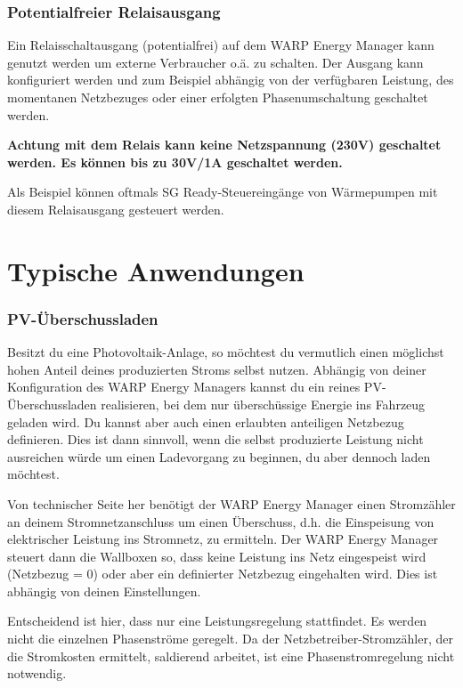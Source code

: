 \documentclass[a4paper,10pt]{article}
\begin{document}
\begin{multicols*}{2}
	\subsubsection{Potentialfreier Relaisausgang}
	Ein Relaisschaltausgang (potentialfrei) auf dem WARP Energy Manager kann
	genutzt werden um externe Verbraucher o.ä. zu schalten. Der Ausgang kann
	konfiguriert werden und zum Beispiel abhängig von der verfügbaren Leistung,
	des momentanen Netzbezuges oder einer erfolgten Phasenumschaltung geschaltet
	werden.

	\textbf{Achtung mit dem Relais kann keine Netzspannung (230V) geschaltet
	werden. Es können bis zu 30V/1A geschaltet werden.}

	Als Beispiel können oftmals SG Ready-Steuereingänge von Wärmepumpen mit
	diesem Relaisausgang gesteuert werden.


	\section{Typische Anwendungen}

	\subsubsection{PV-Überschussladen}
	\label{pv_ueberschussladen}

	Besitzt du eine Photovoltaik-Anlage, so möchtest du vermutlich einen
	möglichst hohen Anteil deines produzierten Stroms selbst nutzen. Abhängig
	von deiner Konfiguration des WARP Energy Managers kannst du ein reines
	PV-Überschussladen realisieren, bei dem nur überschüssige Energie ins
	Fahrzeug geladen wird. Du kannst aber auch einen erlaubten anteiligen Netzbezug
	definieren. Dies ist dann sinnvoll, wenn die selbst produzierte Leistung
	nicht ausreichen würde um einen Ladevorgang zu beginnen, du aber dennoch
	laden möchtest.

	Von technischer Seite her benötigt der WARP Energy Manager einen Stromzähler
	an deinem Stromnetzanschluss um einen Überschuss, d.h. die Einspeisung von
	elektrischer Leistung ins Stromnetz, zu ermitteln. Der WARP Energy Manager
	steuert dann die Wallboxen so, dass keine Leistung ins Netz eingespeist wird
	(Netzbezug = 0) oder aber ein definierter Netzbezug eingehalten wird. Dies
	ist abhängig von deinen Einstellungen.

	Entscheidend ist hier, dass nur eine Leistungsregelung stattfindet. Es werden
	nicht die einzelnen Phasenströme geregelt. Da der Netzbetreiber-Stromzähler,
	der die Stromkosten ermittelt, saldierend arbeitet, ist eine
	Phasenstromregelung nicht notwendig.


\end{multicols*}
\end{document}
